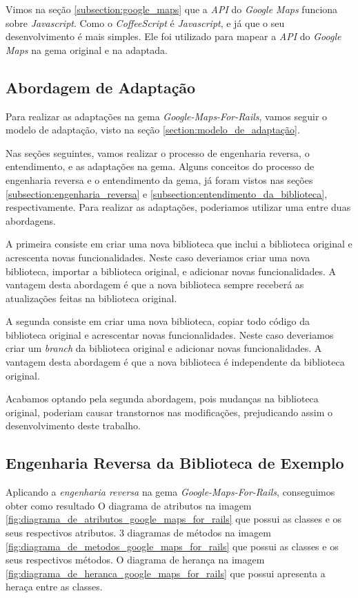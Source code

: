 Vimos na seção \ref{subsection:google_maps} que a \emph{API} do \emph{Google Maps} funciona sobre
\emph{Javascript}. Como o \emph{CoffeeScript} é \emph{Javascript}, e já que o seu desenvolvimento
é mais simples. Ele foi utilizado para mapear a \emph{API} do \emph{Google Maps} na gema original
e na adaptada.


\subsection{Abordagem de Adaptação}
\label{subsection:abordagem_de_adaptacao}


Para realizar as adaptações na gema \emph{Google-Maps-For-Rails}, vamos seguir o modelo de adaptação,
visto na seção \ref{section:modelo_de_adaptação}.

Nas seções seguintes, vamos realizar o processo de engenharia reversa, o entendimento, e as adaptações
na gema. Alguns conceitos do processo de engenharia reversa e o entendimento da gema, já foram vistos
nas seções \ref{subsection:engenharia_reversa} e \ref{subsection:entendimento_da_biblioteca},
respectivamente. Para realizar as adaptações, poderiamos utilizar uma entre duas abordagens.

A primeira consiste em criar uma nova biblioteca que inclui a biblioteca original e acrescenta novas
funcionalidades. Neste caso deveriamos criar uma nova biblioteca, importar a biblioteca original, e
adicionar novas funcionalidades. A vantagem desta abordagem é que a nova biblioteca sempre receberá
as atualizações feitas na biblioteca original.

A segunda consiste em criar uma nova biblioteca, copiar todo código da biblioteca original e acrescentar
novas funcionalidades. Neste caso deveriamos criar um \emph{branch} da biblioteca original e adicionar
novas funcionalidades. A vantagem desta abordagem é que a nova biblioteca é independente da biblioteca
original.

Acabamos optando pela segunda abordagem, pois mudanças na biblioteca original, poderiam causar
transtornos nas modificações, prejudicando assim o desenvolvimento deste trabalho.


\subsection{Engenharia Reversa da Biblioteca de Exemplo}
\label{subsection:engenharia_reversa_da_biblioteca_de_exemplo}


Aplicando a \emph{engenharia reversa} na gema \emph{Google-Maps-For-Rails}, conseguimos obter como resultado
O diagrama de atributos na imagem \ref{fig:diagrama_de_atributos_google_maps_for_rails} que possui as classes
e os seus respectivos atributos. 3 diagramas de métodos na imagem
\ref{fig:diagrama_de_metodos_google_maps_for_rails} que possui as classes e os seus respectivos métodos.
O diagrama de herança na imagem \ref{fig:diagrama_de_heranca_google_maps_for_rails} que possui apresenta a
heraça entre as classes.

